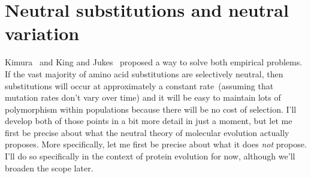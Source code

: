 \documentclass[12pt]{article}
\begin{document}
\section*{Neutral substitutions and neutral variation}

Kimura~\cite{Kimura68} and King and Jukes~\cite{King-Jukes69} proposed
a way to solve both empirical problems. If the vast majority of amino
acid substitutions are selectively neutral, then substitutions will
occur at approximately a constant rate~(assuming that mutation rates
don't vary over time) and it will be easy to maintain lots of
polymorphism within populations because there will be no cost of
selection. I'll develop both of those points in a bit more detail in
just a moment, but let me first be precise about what the neutral
theory of molecular evolution actually proposes. More specifically,
let me first be precise about what it does {\it not\/} propose. I'll
do so specifically in the context of protein evolution for now,
although we'll broaden the scope later.
\end{document}

